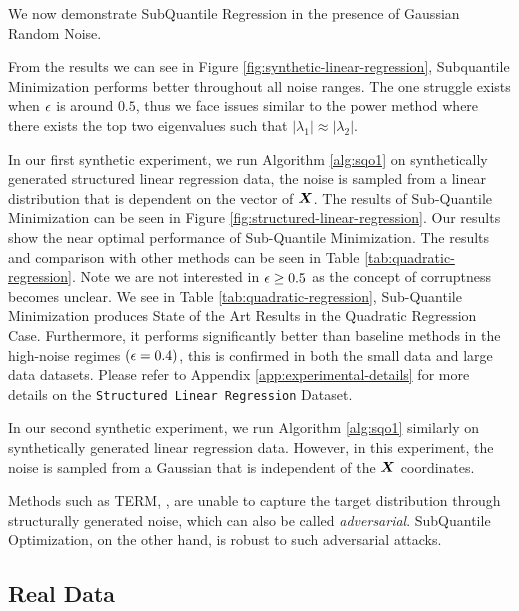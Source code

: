 \documentclass{article} %
\begin{document}
	We now demonstrate SubQuantile Regression in the presence of Gaussian Random Noise. 
		

	From the results we can see in Figure \ref{fig:synthetic-linear-regression}, Subquantile Minimization performs better throughout all noise ranges. The one struggle exists when ${\epsilon}$ is around $0.5$, thus we face issues similar to the power method where there exists the top two eigenvalues such that $|\lambda_1| \approx |\lambda_2|$.
	
	In our first synthetic experiment, we run Algorithm \ref{alg:sqo1} on synthetically generated structured linear regression data, the noise is sampled from a linear distribution that is dependent on the vector of ${\bm{X}}$. The results of Sub-Quantile Minimization can be seen in Figure \ref{fig:structured-linear-regression}. Our results show the near optimal performance of Sub-Quantile Minimization. The results and comparison with other methods can be seen in Table \ref{tab:quadratic-regression}. Note we are not interested in ${\epsilon} \geq 0.5$ as the concept of corruptness becomes unclear. We see in Table \ref{tab:quadratic-regression}, Sub-Quantile Minimization produces State of the Art Results in the Quadratic Regression Case. Furthermore, it performs significantly better than baseline methods in the high-noise regimes $({\epsilon} = 0.4)$, this is confirmed in both the small data and large data datasets. Please refer to Appendix \ref{app:experimental-details} for more details on the \texttt{Structured Linear Regression} Dataset. 
	
	In our second synthetic experiment, we run Algorithm \ref{alg:sqo1} similarly on synthetically generated linear regression data. However, in this experiment, the noise is sampled from a Gaussian that is independent of the ${\bm{X}}$ coordinates. 
	
	Methods such as TERM, \cite{li2020tilted}, are unable to capture the target distribution through structurally generated noise, which can also be called \textit{adversarial}. SubQuantile Optimization, on the other hand, is robust to such adversarial attacks. 

	\subsection{Real Data}
	
\end{document}
